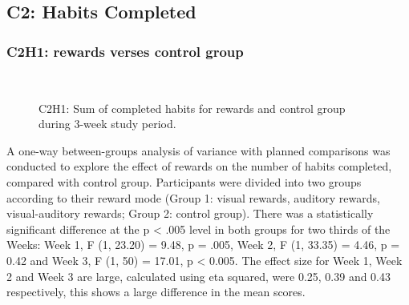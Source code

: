 \documentclass{scaffold/sigchi}
\begin{document}
\subsection{C2: Habits Completed}

\subsubsection{C2H1: rewards verses control group}

\begin{figure}
  \centering
  \caption{C2H1: Sum of completed habits for rewards and control group during 3-week study period.}~\label{fig:c2_h2}
\end{figure}

A one-way between-groups analysis of variance with planned comparisons was conducted to explore the effect of rewards on the number of habits completed, compared with control group. Participants were divided into two groups according to their reward mode (Group 1: visual rewards, auditory rewards, visual-auditory rewards; Group 2: control group). There was a statistically significant difference at the p < .005 level in both groups for two thirds of the Weeks: Week 1, F (1, 23.20) = 9.48, p = .005, Week 2, F (1, 33.35) = 4.46, p = 0.42 and Week 3, F (1, 50) = 17.01, p < 0.005. The effect size for Week 1, Week 2 and Week 3 are large, calculated using eta squared, were 0.25, 0.39 and 0.43 respectively, this shows a large difference in the mean scores.
\end{document}
